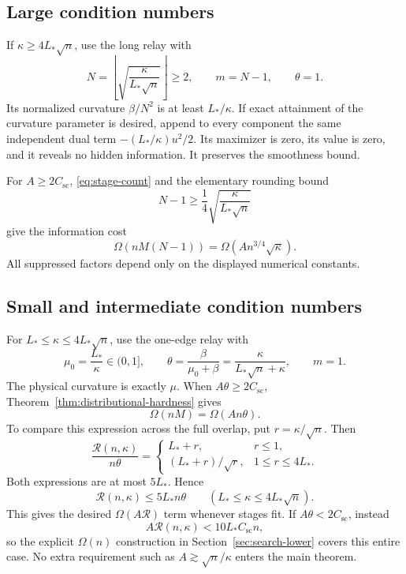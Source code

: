 \documentclass[11pt,letterpaper]{article}
\theoremstyle{definition}
\theoremstyle{remark}
\newcommand{\cR}{\mathcal R}
\begin{document}
\subsection{Large condition numbers}

If $\kappa\ge4L_*\sqrt n$, use the long relay with
\begin{equation}
 N=\left\lfloor\sqrt{\frac{\kappa}{L_*\sqrt n}}\right\rfloor\ge2,
 \qquad m=N-1,\qquad\theta=1.
 \label{eq:long-calibration}
\end{equation}
Its normalized curvature $\beta/N^2$ is at least $L_*/\kappa$.
If exact attainment of the curvature parameter is desired, append to every
component the same independent dual term $-(L_*/\kappa)u^2/2$. Its
maximizer is zero, its value is zero, and it reveals no hidden information.
It preserves the smoothness bound.

For $A\ge2C_{\mathrm{sc}}$, \eqref{eq:stage-count} and the elementary
rounding bound
\[
 N-1\ge\frac14\sqrt{\frac\kappa{L_*\sqrt n}}
\]
give the information cost
\begin{equation}
 \Omega(nM(N-1))=\Omega(An^{3/4}\sqrt\kappa).
 \label{eq:large-lower}
\end{equation}
All suppressed factors depend only on the displayed numerical constants.

\subsection{Small and intermediate condition numbers}

For $L_*\le\kappa\le4L_*\sqrt n$, use the one-edge relay with
\begin{equation}
 \mu_0=\frac{L_*}{\kappa}\in(0,1],\qquad
 \theta=\frac\beta{\mu_0+\beta}
       =\frac\kappa{L_*\sqrt n+\kappa},\qquad m=1.
 \label{eq:short-calibration}
\end{equation}
The physical curvature is exactly $\mu$. When
$A\theta\ge2C_{\mathrm{sc}}$, Theorem~\ref{thm:distributional-hardness}
gives
\begin{equation}
 \Omega(nM)=\Omega(An\theta).
 \label{eq:short-lower}
\end{equation}
To compare this expression across the full overlap, put $r=\kappa/\sqrt n$.
Then
\[
 \frac{\cR(n,\kappa)}{n\theta}
 =\begin{cases}
   L_*+r,&r\le1,\\[2pt]
   (L_*+r)/\sqrt r,&1\le r\le4L_*.
  \end{cases}
\]
Both expressions are at most $5L_*$. Hence
\begin{equation}
 \cR(n,\kappa)\le5L_*n\theta
 \qquad(L_*\le\kappa\le4L_*\sqrt n).
 \label{eq:short-comparison}
\end{equation}
This gives the desired $\Omega(A\cR)$ term whenever stages fit.
If $A\theta<2C_{\mathrm{sc}}$, instead
\begin{equation}
 A\cR(n,\kappa)<10L_*C_{\mathrm{sc}}n,
 \label{eq:no-stage}
\end{equation}
so the explicit $\Omega(n)$ construction in
Section~\ref{sec:search-lower} covers this entire case. No extra
requirement such as $A\gtrsim\sqrt n/\kappa$ enters the main theorem.
\end{document}
